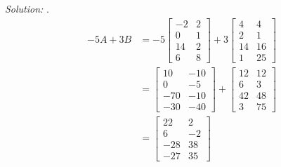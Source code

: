 \documentclass[11pt]{homework}
\begin{document}
\emph{Solution:}
. 
\begin{align*}
-5A + 3B &=
-5
 \begin{bmatrix}
  -2 & 2 \\
  0 & 1 \\
  14 & 2 \\
  6 & 8 
 \end{bmatrix}
+ 3
 \begin{bmatrix}
  4 & 4 \\
  2 & 1 \\
  14 & 16 \\
  1 & 25
 \end{bmatrix} \\
&=
 \begin{bmatrix}
  10 & -10 \\
  0 & -5 \\
  -70 & -10 \\
  -30 & -40
 \end{bmatrix}
+ 
 \begin{bmatrix}
  12 & 12 \\
  6 & 3 \\
  42 & 48 \\
  3 & 75
 \end{bmatrix}\\
&= 
 \begin{bmatrix}
  22 & 2 \\
  6 & -2 \\
  -28 & 38 \\
  -27 & 35
 \end{bmatrix}
\end{align*}
\end{document}
